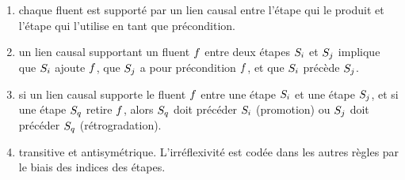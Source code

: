 {\begin{enumerate}
\item {} chaque fluent est supporté par un lien
  causal entre l'étape qui le produit et l'étape
  qui l'utilise en tant que précondition.
\item {} un lien causal supportant un fluent $f$ entre
  deux étapes $S_{i}$ et $S_{j}$ implique que $S_{i}$ ajoute $f$, que $S_{j}$ a pour
  précondition $f$, et que $S_{i}$ précède $S_{j}$.
\item {} si un lien causal supporte le
  fluent $f$ entre une étape $S_{i}$ et une étape $S_{j}$, et si une étape $S_{q}$
  retire $f$, alors $S_{q}$ doit précéder $S_{i}$ (promotion) ou $S_{j}$ doit précéder
  $S_{q}$ (rétrogradation).
\item {} transitive et
  antisymétrique. L'irréflexivité est codée dans les autres règles par le biais
  des indices des étapes.
\end{enumerate}

}
